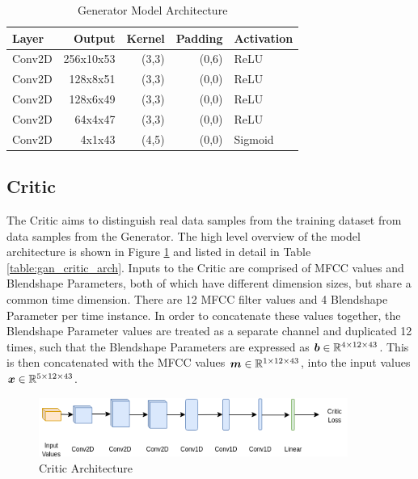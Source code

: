 \begin{table}[h!]
\centering
    \begin{tabular}{ l | r | r | r | l}
    \textbf{Layer} & \textbf{Output} & \textbf{Kernel} & \textbf{Padding} & \textbf{Activation} \\ \hline
    Conv2D & 256x10x53 & (3,3) & (0,6) & ReLU    \\ \hline
    Conv2D & 128x8x51  & (3,3) & (0,0) & ReLU    \\ \hline
    Conv2D & 128x6x49  & (3,3) & (0,0) & ReLU    \\ \hline
    Conv2D & 64x4x47   & (3,3) & (0,0) & ReLU    \\ \hline
    Conv2D & 4x1x43    & (4,5) & (0,0) & Sigmoid 
    \end{tabular} 
    \caption{Generator Model Architecture}\label{table:gan_gen_arch}
\end{table}

\subsection{Critic}
The Critic aims to distinguish real data samples from the training dataset from data samples from the Generator.
The high level overview of the model architecture is shown in Figure \ref{fig:gan_critic_arch} and listed in detail in Table \ref{table:gan_critic_arch}.
Inputs to the Critic are comprised of MFCC values and Blendshape Parameters, both of which have different dimension sizes, but share a common time dimension. 
There are 12 MFCC filter values and 4 Blendshape Parameter per time instance.
In order to concatenate these values together, the Blendshape Parameter values are treated as a separate channel and duplicated 12 times, such that the Blendshape Parameters are expressed as ${\boldsymbol{{b}}} \in \mathbb{R}^{4 \times 12 \times 43}$.
This is then concatenated with the MFCC values ${\boldsymbol{{m}}} \in \mathbb{R}^{1 \times 12 \times 43}$, into the input values ${\boldsymbol{{x}}} \in \mathbb{R}^{5 \times 12 \times 43}$.

\begin{figure}[h!]
    \centering
        \includegraphics[width=0.9\textwidth]{figures/gan/critic.png}
    \caption{Critic Architecture}\label{fig:gan_critic_arch}
\end{figure}

